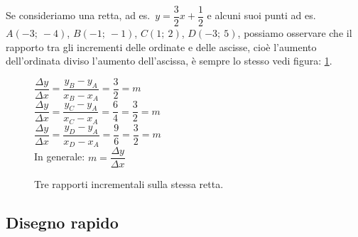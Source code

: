 
Se consideriamo una retta, ad es.~\(y=\dfrac{3}{2}x +\dfrac{1}{2}\) e alcuni 
suoi punti ad es.~\(A(-3;~-4)\), \(B(-1;~-1)\), \(C(1;~2)\), \(D(-3;~5)\), 
possiamo osservare che il rapporto tra gli incrementi delle ordinate e delle 
ascisse, cioè l'aumento dell'ordinata diviso l'aumento dell'ascissa, è sempre 
lo stesso vedi figura: \ref{fig:rappincr}.

\begin{inaccessibleblock}
 \begin{figure}[h]
 \centering
 \begin{minipage}[]{.50\textwidth}
\(\dfrac{\Delta y}{\Delta x} =
\dfrac{y_B - y_A}{x_B - x_A} = \dfrac{3}{2} = m\)\\

\(\dfrac{\Delta y}{\Delta x} =
\dfrac{y_C - y_A}{x_C - x_A} = \dfrac{6}{4} = \dfrac{3}{2} = m\)\\

\(\dfrac{\Delta y}{\Delta x} =
\dfrac{y_D - y_A}{x_D - x_A} = \dfrac{9}{6} = \dfrac{3}{2} = m\)\\

In generale: \(m = \dfrac{\Delta y}{\Delta x}\)
 \end{minipage}
 \begin{minipage}[]{.40\textwidth}
   \centering \rappincr
 \end{minipage}
  \caption{Tre rapporti incrementali sulla stessa retta.}\label{fig:rappincr}
\end{figure}
\end{inaccessibleblock}


\subsection{Disegno rapido}

